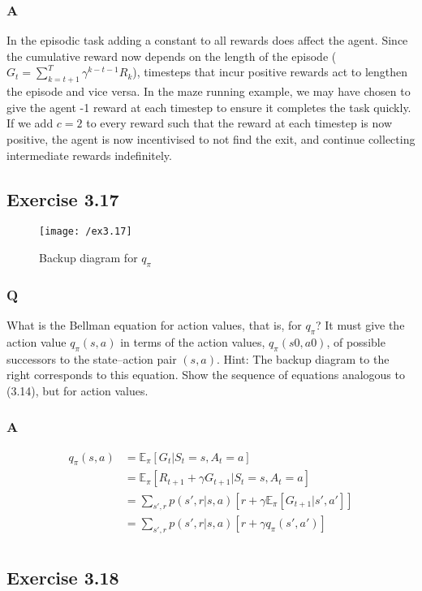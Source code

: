 \subsubsection*{A}
In the episodic task adding a constant to all rewards does affect the agent. Since the cumulative reward now depends on the length of the episode ($G_t = \sum_{k=t+1}^{T} \gamma^{k-t-1}R_k $), timesteps that incur positive rewards act to lengthen the episode and vice versa. In the maze running example, we may have chosen to give the agent -1 reward at each timestep to ensure it completes the task quickly. If we add $c=2$ to every reward such that the reward at each timestep is now positive, the agent is now incentivised to not find the exit, and continue collecting intermediate rewards indefinitely. 

\subsection{Exercise 3.17}
\begin{figure}[h!]
	\centering
	\texttt{[image: /ex3.17]}
	\caption{Backup diagram for $q_\pi$}
	\label{fig:3.17}
\end{figure}
\subsubsection*{Q}
What is the Bellman equation for action values, that is, for $q_\pi$? It must give the action value $q_\pi(s, a)$ in terms of the action values, $q_\pi(s0, a0)$, of possible successors to the state–action pair $(s, a)$. Hint: The backup diagram to the right corresponds to this equation. Show the sequence of equations analogous to (3.14), but for action values.

\subsubsection*{A}
\begin{align}
q_\pi(s,a) &= \mathbb{E}_\pi[G_t | S_t = s, A_t = a] \\
&= \mathbb{E}_\pi[R_{t+1} + \gamma G_{t+1} | S_t = s, A_t = a] \\
&= \sum_{s', r} p(s', r | s, a) [r + \gamma \mathbb{E}_\pi[G_{t+1} | s', a']] \\
&= \sum_{s', r} p(s', r | s, a) [r + \gamma q_\pi(s', a')] \\
\end{align}

\subsection{Exercise 3.18}
